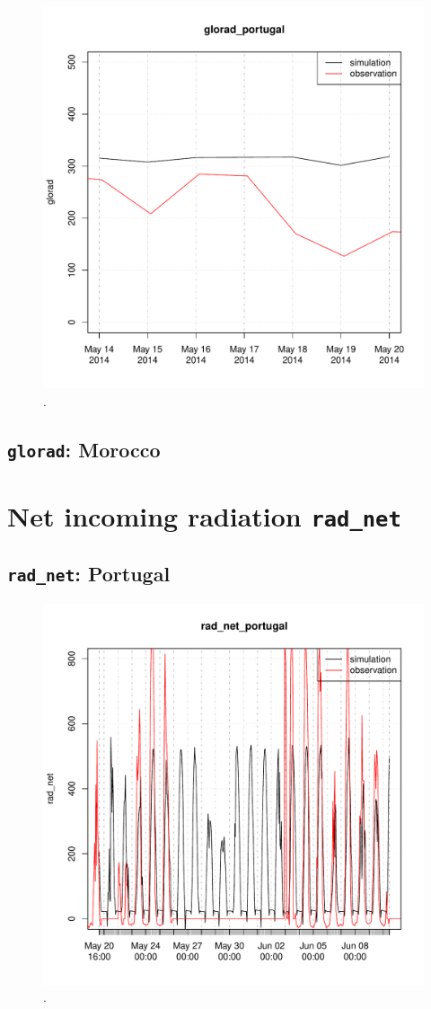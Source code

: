 \documentclass{scrreprt}
\begin{document}
\begin{figure}[ht]
  \centering
  \includegraphics[width=0.8\hsize]{./plot_glorad_compare_portugal_NSA_2014-05-13_2014-05-20.pdf}
  \caption{.}
  \label{fig:portugal_NSA_glorad1}
\end{figure}

\subsection{\texttt{glorad}: Morocco}

\section{Net incoming radiation \texttt{rad\_net}}

\subsection{\texttt{rad\_net}: Portugal}

\begin{figure}[ht]
  \centering
  \includegraphics[width=0.8\hsize]{./plot_rad_net_compare_portugal_HS_2014-04-29_2014-07-01.pdf}
  \caption{.}
  \label{fig:portugal_HS_radnet1}
\end{figure}
\end{document}
